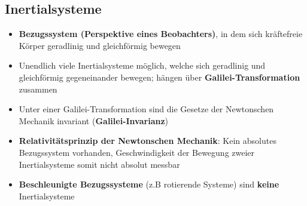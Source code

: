 \subsection{Inertialsysteme}%
\label{newt:sub:inertialsysteme}

\begin{itemize}
	\item \textbf{Bezugssystem (Perspektive eines Beobachters)}, in dem sich kräftefreie Körper geradlinig und gleichförmig bewegen
	\item Unendlich viele Inertialsysteme möglich, welche sich geradlinig und gleichförmig gegeneinander bewegen; hängen über \textbf{Galilei-Transformation} zusammen
	\item Unter einer Galilei-Transformation sind die Gesetze der Newtonschen Mechanik invariant (\textbf{Galilei-Invarianz})
	\item \textbf{Relativitätsprinzip der Newtonschen Mechanik}: Kein absolutes Bezugssystem vorhanden, Geschwindigkeit der Bewegung zweier Inertialsysteme somit nicht absolut messbar
	\item \textbf{Beschleunigte Bezugssysteme} (z.B rotierende Systeme) sind \textbf{keine} Inertialsysteme
\end{itemize}